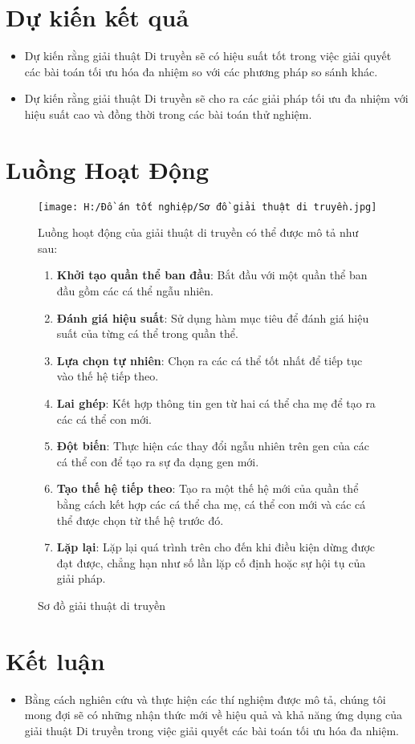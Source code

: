 \documentclass{article}
\begin{document}
\section{Dự kiến kết quả}

\begin{itemize}
	\item Dự kiến rằng giải thuật Di truyền sẽ có hiệu suất tốt trong việc giải quyết các bài toán tối ưu hóa đa nhiệm so với các phương pháp so sánh khác.
	\item Dự kiến rằng giải thuật Di truyền sẽ cho ra các giải pháp tối ưu đa nhiệm với hiệu suất cao và đồng thời trong các bài toán thử nghiệm.
\end{itemize}
\section{Luồng Hoạt Động}

\begin{figure}[h]
	\centering
	\begin{minipage}{0.45\textwidth}
		\centering
		\texttt{[image: H:/Đồ án tốt nghiệp/Sơ đồ giải thuật di truyền.jpg]}
		\caption{Sơ đồ giải thuật di truyền}
		\label{fig:genetic_algorithm_diagram}
	\end{minipage}\hfill
	\begin{minipage}{0.55\textwidth}
		Luồng hoạt động của giải thuật di truyền có thể được mô tả như sau:
		\begin{enumerate}
			\item \textbf{Khởi tạo quần thể ban đầu}: Bắt đầu với một quần thể ban đầu gồm các cá thể ngẫu nhiên.
			\item \textbf{Đánh giá hiệu suất}: Sử dụng hàm mục tiêu để đánh giá hiệu suất của từng cá thể trong quần thể.
			\item \textbf{Lựa chọn tự nhiên}: Chọn ra các cá thể tốt nhất để tiếp tục vào thế hệ tiếp theo.
			\item \textbf{Lai ghép}: Kết hợp thông tin gen từ hai cá thể cha mẹ để tạo ra các cá thể con mới.
			\item \textbf{Đột biến}: Thực hiện các thay đổi ngẫu nhiên trên gen của các cá thể con để tạo ra sự đa dạng gen mới.
			\item \textbf{Tạo thế hệ tiếp theo}: Tạo ra một thế hệ mới của quần thể bằng cách kết hợp các cá thể cha mẹ, cá thể con mới và các cá thể được chọn từ thế hệ trước đó.
			\item \textbf{Lặp lại}: Lặp lại quá trình trên cho đến khi điều kiện dừng được đạt được, chẳng hạn như số lần lặp cố định hoặc sự hội tụ của giải pháp.
		\end{enumerate}
	\end{minipage}
\end{figure}

\section{Kết luận}
\begin{itemize}

	\item Bằng cách nghiên cứu và thực hiện các thí nghiệm được mô tả, chúng tôi mong đợi sẽ có những nhận thức mới về hiệu quả và khả năng ứng dụng của giải thuật Di truyền trong việc giải quyết các bài toán tối ưu hóa đa nhiệm.
\end{itemize}
\end{document}
